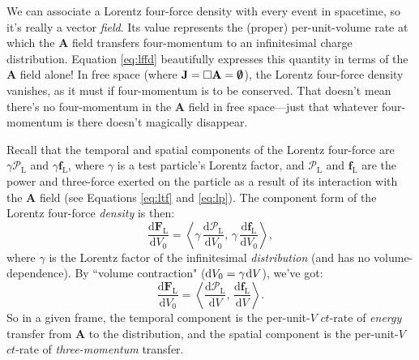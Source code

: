 \documentclass[12pt]{article}
\renewcommand{\vv}[1]{\mathbf{#1}}
\newcommand{\dd}[1]{\mathrm{d}#1}
\begin{document}
We can associate a Lorentz four-force density with every event in spacetime, so it's really a vector \emph{field}. Its value represents the (proper) per-unit-volume rate at which the $\vv A$ field transfers four-momentum to an infinitesimal charge distribution. Equation \ref{eq:lffd} beautifully expresses this quantity in terms of the $\vv A$ field alone! In free space (where $\vv J = \Box \vv A = \textrm{\mbox{\boldmath $\emptyset$}}$), the Lorentz four-force density vanishes, as it must if four-momentum is to be conserved. That doesn't mean there's no four-momentum in the $\vv A$ field in free space---just that whatever four-momentum is there doesn't magically disappear.

Recall that the temporal and spatial components of the Lorentz four-force are $\gamma \mathcal{P}_{\mathrm{L}}$ and $\gamma \vv f_{\textrm{L}}$, where $\gamma$ is a test particle's Lorentz factor, and $\mathcal{P}_{\mathrm{L}}$ and $\vv f_{\textrm{L}}$ are the power and three-force exerted on the particle as a result of its interaction with the $\vv A$ field (see Equations  \ref{eq:ltf} and \ref{eq:lp}). The component form of the Lorentz four-force \emph{density} is then:
\begin{equation*}
\dfrac{\dd \vv F_{\mathrm{L}}}{\dd V_0} = \left \langle \gamma \, \dfrac{\dd \mathcal{P}_{\textrm{L}} }{\dd V_0}, \, \gamma \, \dfrac{\dd \vv f_{\textrm{L}}}{\dd V_0} \right \rangle,
\end{equation*}
where $\gamma$ is the Lorentz factor of the infinitesimal \emph{distribution} (and has no volume-dependence). By ``volume contraction" ($\dd V_0 = \gamma \mkern1mu \dd V$), we've got:
\begin{equation}\label{eq:lffdc}
\dfrac{\dd \vv F_{\mathrm{L}}}{\dd V_0} = \left \langle \dfrac{\dd \mathcal{P}_{\mathrm{L}}}{\dd V}, \, \dfrac{\dd \vv f_{\mathrm{L}}}{\dd V} \right \rangle .
\end{equation}
So in a given frame, the temporal component is the per-unit-$V$ $ct$-rate of \emph{energy} transfer from $\vv A$ to the distribution, and the spatial component is the per-unit-$V$ $ct$-rate of \emph{three-momentum} transfer.
\end{document}
